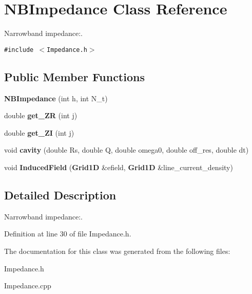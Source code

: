 \section{NBImpedance Class Reference}
\label{classNBImpedance}
Narrowband impedance:.  


{\tt \#include $<$Impedance.h$>$}

\subsection*{Public Member Functions}
\begin{CompactItemize}
\item 
\textbf{NBImpedance} (int h, int N\_\-t)\label{classNBImpedance_fb86775b25f2b2ab74e17b0e530dbac7}

\item 
double \textbf{get\_\-ZR} (int j)\label{classNBImpedance_3320113c7f5382f338ee8f3531979e42}

\item 
double \textbf{get\_\-ZI} (int j)\label{classNBImpedance_d655034af6b69d8f8233d94ea9f8efe8}

\item 
void \textbf{cavity} (double Rs, double Q, double omega0, double off\_\-res, double dt)\label{classNBImpedance_c2f15e442083072b21d6608c4da32537}

\item 
void \textbf{InducedField} ({\bf Grid1D} \&efield, {\bf Grid1D} \&line\_\-current\_\-density)\label{classNBImpedance_dd8f46a6226a715867334eb6cb11bf57}

\end{CompactItemize}


\subsection{Detailed Description}
Narrowband impedance:. 

Definition at line 30 of file Impedance.h.

The documentation for this class was generated from the following files:\begin{CompactItemize}
\item 
Impedance.h\item 
Impedance.cpp\end{CompactItemize}

